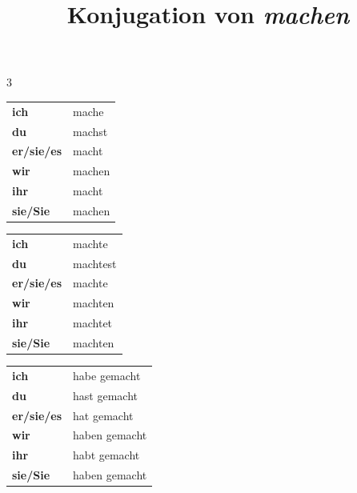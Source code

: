 \documentclass[a4paper,10pt]{article}
\title{Konjugation von \textit{machen}}
\date{}
\begin{document}
    \maketitle
    \small
    \begin{multicols}{3}
        
        \begin{tcolorbox}[tensebox,title=Präsens]
            \begin{tabular}{>{\bfseries}l l}
                ich       & mache  \\
                du        & machst \\
                er/sie/es & macht  \\
                wir       & machen \\
                ihr       & macht  \\
                sie/Sie   & machen \\
            \end{tabular}
        \end{tcolorbox}
        
        \begin{tcolorbox}[tensebox,title=Präteritum]
            \begin{tabular}{>{\bfseries}l l}
                ich       & machte   \\
                du        & machtest \\
                er/sie/es & machte   \\
                wir       & machten  \\
                ihr       & machtet  \\
                sie/Sie   & machten  \\
            \end{tabular}
        \end{tcolorbox}
        
        \begin{tcolorbox}[tensebox,title=Perfekt]
            \begin{tabular}{>{\bfseries}l l}
                ich       & habe gemacht  \\
                du        & hast gemacht  \\
                er/sie/es & hat gemacht   \\
                wir       & haben gemacht \\
                ihr       & habt gemacht  \\
                sie/Sie   & haben gemacht \\
            \end{tabular}
        \end{tcolorbox}
        

\end{multicols}
\end{document}
